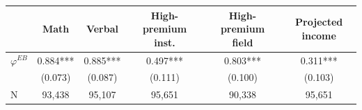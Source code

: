 \begin{tabular}{lccccc}
\toprule
 & Math & Verbal & High-premium inst. & High-premium field & Projected income \\
\midrule
$\varphi^{EB}$ & 0.884*** & 0.885*** & 0.497*** & 0.803*** & 0.311*** \\
 & (0.073) & (0.087) & (0.111) & (0.100) & (0.103) \\
N & 93,438 & 95,107 & 95,651 & 90,338 & 95,651 \\
\bottomrule
\end{tabular}
